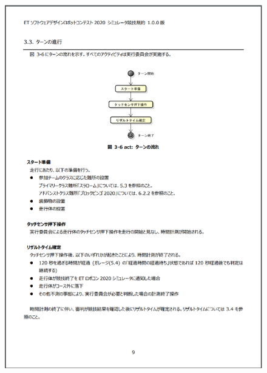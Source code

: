 \documentclass[uplatex, report, a4j, 10pt]{jsbook}
\begin{document}
\begin{figure}[tp]
    \begin{center}
    \includegraphics[width=\hsize]{specification/ET_6.eps}
    \end{center}
\end{figure}
\end{document}
